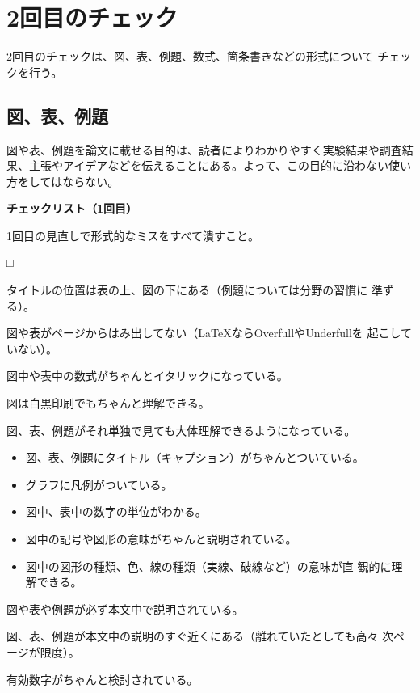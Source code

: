 \documentclass[11pt,a4j]{jsarticle}
\begin{document}
\section{2回目のチェック}

2回目のチェックは、図、表、例題、数式、箇条書きなどの形式について
チェックを行う。

\subsection{図、表、例題}

図や表、例題を論文に載せる目的は、読者によりわかりやすく実験結果や調査結
果、主張やアイデアなどを伝えることにある。よって、この目的に沿わない使い
方をしてはならない。

\begin{flushleft}
 {\bf チェックリスト（1回目）}
\end{flushleft}
1回目の見直しで形式的なミスをすべて潰すこと。
\begin{list}%
 {□} %
 {} %
 \item タイトルの位置は表の上、図の下にある（例題については分野の習慣に
       準ずる）。
 \item 図や表がページからはみ出してない（LaTeXならOverfullやUnderfullを
       起こしていない）。
 \item 図中や表中の数式がちゃんとイタリックになっている。
 \item 図は白黒印刷でもちゃんと理解できる。
 \item 図、表、例題がそれ単独で見ても大体理解できるようになっている。
       \begin{itemize}
	\item 図、表、例題にタイトル（キャプション）がちゃんとついている。
	\item グラフに凡例がついている。
	\item 図中、表中の数字の単位がわかる。
	\item 図中の記号や図形の意味がちゃんと説明されている。
	\item 図中の図形の種類、色、線の種類（実線、破線など）の意味が直
	      観的に理解できる。
       \end{itemize}
 \item 図や表や例題が必ず本文中で説明されている。
 \item 図、表、例題が本文中の説明のすぐ近くにある（離れていたとしても高々
       次ページが限度）。
 \item 有効数字がちゃんと検討されている。
\end{list}
\end{document}
